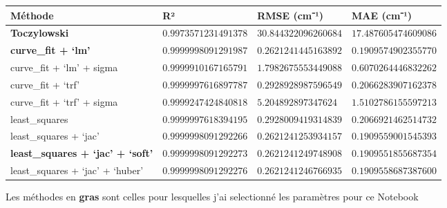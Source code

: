 \documentclass[11pt]{article}
\begin{document}
{\def\LTcaptype{none} %
\begin{longtable}[]{@{}
  >{\raggedright\arraybackslash}p{}
  >{\raggedright\arraybackslash}p{}
  >{\raggedright\arraybackslash}p{}
  >{\raggedright\arraybackslash}p{}@{}}
\toprule\noalign{}
\begin{minipage}[b]{\linewidth}\raggedright
Méthode
\end{minipage} & \begin{minipage}[b]{\linewidth}\raggedright
R²
\end{minipage} & \begin{minipage}[b]{\linewidth}\raggedright
RMSE (cm⁻¹)
\end{minipage} & \begin{minipage}[b]{\linewidth}\raggedright
MAE (cm⁻¹)
\end{minipage} \\
\midrule\noalign{}
\endhead
\bottomrule\noalign{}
\endlastfoot
\textbf{Toczylowski} & \(0.9973571231491378\) & \(30.844322096260684\) &
\(17.487605474609086\) \\
\textbf{curve\_fit + `lm'} & \(0.9999998091291987\) &
\(0.2621241445163892\) & \(0.1909574902355770\) \\
curve\_fit + `lm' + sigma & \(0.9999910167165791\) &
\(1.7982675553449088\) & \(0.6070264446832262\) \\
curve\_fit + `trf' & \(0.9999997616897787\) & \(0.2928928987596549\) &
\(0.2066283907162378\) \\
curve\_fit + `trf' + sigma & \(0.9999247424840818\) &
\(5.204892897347624\) & \(1.5102786155597213\) \\
least\_squares & \(0.9999997618394195\) & \(0.2928009419314839\) &
\(0.2066921462514732\) \\
least\_squares + `jac' & \(0.9999998091292266\) & \(0.2621241253934157\)
& \(0.1909559001545393\) \\
\textbf{least\_squares + `jac' + `soft'} & \(0.9999998091292273\) &
\(0.2621241249748908\) & \(0.1909551855687354\) \\
least\_squares + `jac' + `huber' & \(0.9999998091292276\) &
\(0.2621241246766935\) & \(0.1909558687387600\) \\
\end{longtable}
}

Les méthodes en \textbf{gras} sont celles pour lesquelles j'ai
selectionné les paramètres pour ce Notebook
\end{document}

